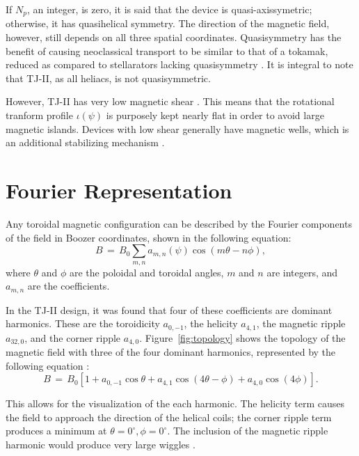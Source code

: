 \documentclass[a4paper, 12pt]{article}
\begin{document}
If $N_p$, an integer, is zero, it is said that the device is quasi-axissymetric; otherwise, it has quasihelical symmetry. The direction of the magnetic field, however, still depends on all three spatial coordinates. Quasisymmetry has the benefit of causing neoclassical transport to be similar to that of a tokamak, reduced as compared to stellarators lacking quasisymmetry \cite{boozer_what_1998}. It is integral to note that TJ-II, as all heliacs, is not quasisymmetric.

However, TJ-II has very low magnetic shear \cite{milligen_mhd_2012}. This means that the rotational tranform profile $\iota(\psi)$ is purposely kept nearly flat in order to avoid large magnetic islands. Devices with low shear generally have magnetic wells, which is an additional stabilizing mechanism \cite{aguilera_magnetic_2015}.


\section*{Fourier Representation}
Any toroidal magnetic configuration can be described by the Fourier components of the field in Boozer coordinates, shown in the following equation:
\begin{equation*}
	B \,=\, B_0 \sum_{m,n} a_{m,n}\left(\psi\right) \cos\left(m\theta - n\phi\right),
\end{equation*}
where $\theta$ and $\phi$ are the poloidal and toroidal angles, $m$ and $n$ are integers, and $a_{m,n}$ are the coefficients.

In the TJ-II design, it was found that four of these coefficients are dominant harmonics. These are the toroidicity $a_{0,-1}$, the helicity $a_{4,1}$, the magnetic ripple $a_{32,0}$, and the corner ripple $a_{4,0}$. Figure~\ref{fig:topology} shows the topology of the magnetic field with three of the four dominant harmonics, represented by the following equation \cite{solano_study_1988}:
\begin{equation}
	B \,=\,B_0\left[1 + a_{0,-1}\cos\theta + a_{4,1}\cos\left(4\theta - \phi\right) + a_{4,0}\cos\left(4\phi\right)\right].
\end{equation}

This allows for the visualization of the each harmonic. The helicity term causes the field to approach the direction of the helical coils; the corner ripple term produces a minimum at $\theta = 0^{\circ}, \phi = 0^{\circ}$. The inclusion of the magnetic ripple harmonic would produce very large wiggles \cite{solano_study_1988}.
\end{document}

